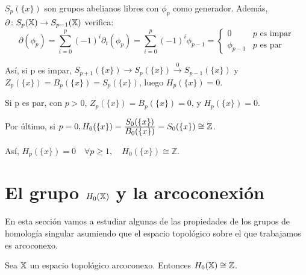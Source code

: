 $S_p({\{x\}})$ son grupos abelianos libres con $\phi_p$ como generador. Además, $\partial \colon S_{p}({\mathbb X}) \to S_{p-1}({\mathbb X})$ verifica:
\[\partial(\phi_p) = \sum_{i = 0}^p (-1)^i \partial_i(\phi_p) =  \sum_{i = 0}^p (-1)^i \phi_{p-1} = \begin{cases}
                                                                                                            0 & p \text{ es impar} \\
                                                                                                            \phi_{p-1} & p \text{ es par}
                                                                                                    \end{cases}   \]

Así, si p es impar, $S_{p+1}(\{x\}) \to S_p(\{x\}) \xrightarrow{0} S_{p-1}(\{x\})$ y $Z_p(\{x\}) = B_p(\{x\}) = S_p(\{x\})$, luego
$H_p(\{x\}) = 0$.

Si p es par, con $p > 0$, $Z_p(\{x\}) = B_p(\{x\}) = 0$, y $H_p(\{x\}) = 0$.

Por último, si $ p = 0, H_0(\{x\}) = \frac{\displaystyle S_0(\{x\})}{\displaystyle B_0(\{x\})} = S_0(\{x\}) \cong \mathbb Z$.

Así, $H_p(\{x\}) = 0 \hspace{1em} \forall p \geq 1, \hspace{1em} H_0(\{x\}) \cong \mathbb Z$.

\section{El grupo $H_0({\mathbb X})$ y la arcoconexión}

En esta sección vamos a estudiar algunas de las propiedades de los grupos de homología singular asumiendo que el espacio topológico
sobre el que trabajamos es arcoconexo.

\begin{proposition}
  Sea ${\mathbb X}$ un espacio topológico arcoconexo. Entonces $H_0({\mathbb X}) \cong \mathbb Z$.
\end{proposition}

